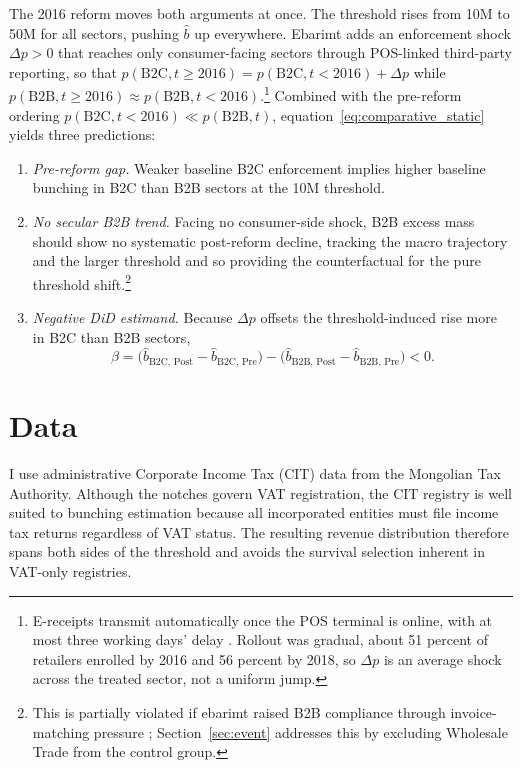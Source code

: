\documentclass[12pt,oneside,a4paper]{report}
\begin{document}
The 2016 reform moves both arguments at once. The threshold rises from 10M to 50M for all sectors, pushing $\hat{b}$ up everywhere. Ebarimt adds an enforcement shock $\Delta p > 0$ that reaches only consumer-facing sectors through POS-linked third-party reporting, so that $p(\text{B2C}, t \geq 2016) = p(\text{B2C}, t < 2016) + \Delta p$ while $p(\text{B2B}, t \geq 2016) \approx p(\text{B2B}, t < 2016)$.\footnote{E-receipts transmit automatically once the POS terminal is online, with at most three working days' delay \parencite{nyamdavaa2023does}. Rollout was gradual, about 51 percent of retailers enrolled by 2016 and 56 percent by 2018, so $\Delta p$ is an average shock across the treated sector, not a uniform jump.} Combined with the pre-reform ordering $p(\text{B2C}, t<2016) \ll p(\text{B2B}, t)$, equation~\eqref{eq:comparative_static} yields three predictions:
\begin{enumerate}
    \item \textit{Pre-reform gap.} Weaker baseline B2C enforcement implies higher baseline bunching in B2C than B2B sectors at the 10M threshold.

    \item \textit{No secular B2B trend.} Facing no consumer-side shock, B2B excess mass should show no systematic post-reform decline, tracking the macro trajectory and the larger threshold and so providing the counterfactual for the pure threshold shift.\footnote{This is partially violated if ebarimt raised B2B compliance through invoice-matching pressure \parencite{nyamdavaa2023does}; Section~\ref{sec:event} addresses this by excluding Wholesale Trade from the control group.}

    \item \textit{Negative DiD estimand.} Because $\Delta p$ offsets the threshold-induced rise more in B2C than B2B sectors,
    \begin{equation}
    \beta = \bigl(\hat{b}_{\text{B2C, Post}} - \hat{b}_{\text{B2C, Pre}}\bigr)
          - \bigl(\hat{b}_{\text{B2B, Post}} - \hat{b}_{\text{B2B, Pre}}\bigr) < 0 .
    \end{equation}
\end{enumerate}


\section{Data}
\label{subsec:descriptive}

I use administrative Corporate Income Tax (CIT) data from the Mongolian Tax Authority. Although the notches govern VAT registration, the CIT registry is well suited to bunching estimation because all incorporated entities must file income tax returns regardless of VAT status. The resulting revenue distribution therefore spans both sides of the threshold and avoids the survival selection inherent in VAT-only registries.
\end{document}

